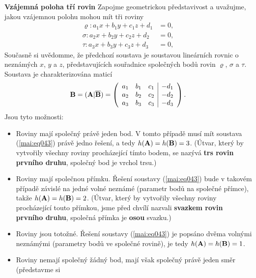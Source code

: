 \wikitextrule
\begin{example}\label{mai:exam043}
  \textbf{Vzájemná poloha tří rovin}\newline\small
  Zapojme geometrickou představivost a uvažujme, jakou vzájemnou polohu mohou mít tři roviny
  \begin{align*}
    \varrho: a_1x + b_1y + c_1z + d_1 &= 0, \\
    \sigma : a_2x + b_2y + c_2z + d_2 &= 0, \\
    \tau   : a_3x + b_3y + c_3z + d_3 &= 0,
  \end{align*}
  Současně si uvědomme, že předchozí soustava je soustavou lineárních rovnic o neznámých \(x\), 
  \(y\) a \(z\), představujících souřadnice společných bodů rovin \(\varrho\), \(\sigma\) a 
  \(\tau\). Soustava je charakterizována maticí
  \begin{equation}\label{mai:eq043}
    \mathbf{B} = (\mathbf{A}|\overline{\mathbf{B}}) =
    \left(
      \begin{array}{rrr|r}
         a_1 & b_1 & c_1 & -d_1    \\
         a_2 & b_2 & c_2 & -d_2    \\
         a_3 & b_3 & c_3 & -d_3
      \end{array}
    \right).
  \end{equation}
  Jsou tyto možnosti:
  \begin{itemize}
    \item Roviny mají společný právě jeden bod. V tomto případě musí mít soustava (\ref{mai:eq043}) 
          právě jedno řešení, a tedy \(h(\mathbf{A}) = h(\mathbf{B}) = 3\). (Útvar, který by vytvořily 
          všechny roviny procházející tímto bodem, se nazývá \textbf{trs rovin prvního druhu}, 
          společný bod je vrchol trsu.)
    \item Roviny mají společnou přímku. Řešení soustavy (\ref{mai:eq043}) bude v takovém případě 
          závislé na jedné volné neznámé (parametr bodů na společné přímce), takže \(h(\mathbf{A}) = 
          h(\mathbf{B}) = 2\). (Útvar, který by vytvořily všechny roviny procházející touto přímkou, 
          jsme před chvílí nazvali \textbf{svazkem rovin prvního druhu}, společná přímka je 
          \textbf{osou} svazku.)
    \item Roviny jsou totožné. Řešení soustavy (\ref{mai:eq043}) je popsáno dvěma volnými neznámými 
          (parametry bodů ve společné rovině), je tedy \(h(\mathbf{A}) = h(\mathbf{B}) = 1\).
    \item Roviny nemají společný žádný bod, mají však společný právě jeden směr (představme si 

\end{itemize}
\end{example}
